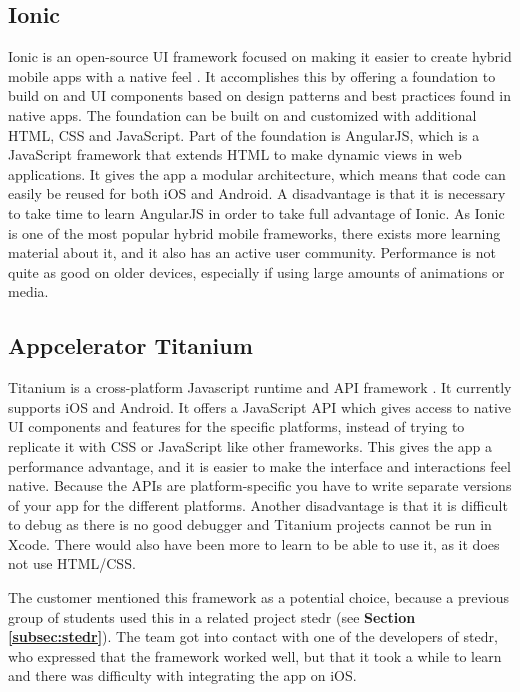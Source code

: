 \subsection{Ionic}
\label{subsec:ionic}

Ionic is an open-source UI framework focused on making it easier to create hybrid mobile apps with a native feel \cite{RA1}. It accomplishes this by offering a foundation to build on and UI components based on design patterns and best practices found in native apps. The foundation can be built on and customized with additional HTML, CSS and JavaScript. Part of the foundation is AngularJS, which is a JavaScript framework that extends HTML to make dynamic views in web applications. It gives the app a modular architecture, which means that code can easily be reused for both iOS and Android. A disadvantage is that it is necessary to take time to learn AngularJS in order to take full advantage of Ionic. As Ionic is one of the most popular hybrid mobile frameworks, there exists more learning material about it, and it also has an active user community. Performance is not quite as good on older devices, especially if using large amounts of animations or media.

\subsection{Appcelerator Titanium}

Titanium is a cross-platform Javascript runtime and API framework \cite{RA3}. It currently supports iOS and Android. It offers a JavaScript API which gives access to native UI components and features for the specific platforms, instead of trying to replicate it with CSS or JavaScript like other frameworks. This gives the app a performance advantage, and it is easier to make the interface and interactions feel native. Because the APIs are platform-specific you have to write separate versions of your app for the different platforms. Another disadvantage is that it is difficult to debug as there is no good debugger and Titanium projects cannot be run in Xcode. There would also have been more to learn to be able to use it, as it does not use HTML/CSS.\newline

The customer mentioned this framework as a potential choice, because a previous group of students used this in a related project stedr (see \textbf{Section \ref{subsec:stedr}}). The team got into contact with one of the developers of stedr, who expressed that the framework worked well, but that it took a while to learn and there was difficulty with integrating the app on iOS.

